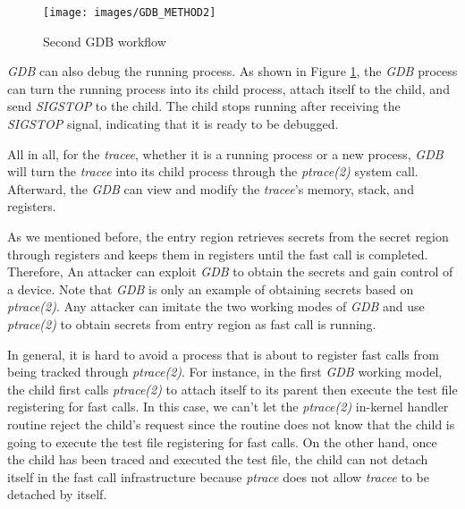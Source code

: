 \begin{figure}[tbp]
  \centering
  \texttt{[image: images/GDB\_METHOD2]}
  \caption[Short description]{Second GDB workflow}
  \label{fig:GDB_METHOD2}
\end{figure}

\emph{GDB} can also debug the running process. As shown in Figure \ref{fig:GDB_METHOD2}, 
the \emph{GDB} process can turn the running process into its child process, 
attach itself to the child, and send \emph{SIGSTOP} to the child. 
The child stops running after receiving the \emph{SIGSTOP} signal, 
indicating that it is ready to be debugged.

All in all, for the \emph{tracee}, whether it is a running process or 
a new process, \emph{GDB} will turn the \emph{tracee} into its child process 
through the \emph{ptrace(2)} system call. Afterward, the \emph{GDB} can view and modify 
the \emph{tracee}'s memory, stack, and registers.

As we mentioned before, the entry region retrieves secrets 
from the secret region through registers and keeps them in registers until the fast call is completed. 
Therefore, An attacker can exploit \emph{GDB}  to obtain the secrets 
and gain control of a device.  Note that \emph{GDB} is only an example of obtaining 
secrets based on \emph{ptrace(2)}. Any attacker can imitate the two working modes of 
\emph{GDB} and use \emph{ptrace(2)} to obtain secrets from entry region as fast call is running.

In general, it is hard to avoid a process that is about to register 
fast calls from being tracked through \emph{ptrace(2)}.  For instance, 
in the first \emph{GDB}  working model, the child first calls \emph{ptrace(2)} to 
attach itself to its parent then execute the test file registering for fast calls. 
In this case, we can't let the \emph{ptrace(2)} in-kernel handler routine reject the child's 
request since the routine does not know that the child is going to execute the test file 
registering for fast calls. On the other hand, once the child has been traced and executed 
the test file, the child can not detach itself in the fast call infrastructure because 
\emph{ptrace} does not allow \emph{tracee} to be detached by itself.

